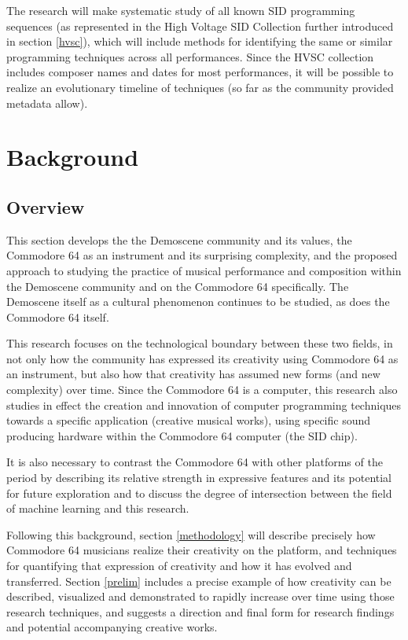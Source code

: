 \documentclass[10pt]{article}
\begin{document}
\begin{multicols*}{2}
The research will make systematic study of all known SID programming sequences (as represented in the High Voltage SID Collection\cite{hvsc} further introduced in section \ref{hvsc}), which will include methods for identifying the same or similar programming techniques across all performances. Since the HVSC collection includes composer names and dates for most performances, it will be possible to realize an evolutionary timeline of techniques (so far as the community provided metadata allow).

  \section{Background}

  \subsection{Overview}

This section develops the  the Demoscene community and its values, the Commodore 64 as an instrument and its surprising complexity, and the proposed approach to studying the practice of musical performance and composition within the Demoscene community and on the Commodore 64 specifically. The Demoscene itself as a cultural phenomenon continues to be studied, as does the Commodore 64 itself.

This research focuses on the technological boundary between these two fields, in not only how the community has expressed its creativity using Commodore 64 as an instrument, but also how that creativity has assumed new forms (and new complexity) over time. Since the Commodore 64 is a computer, this research also studies in effect the creation and innovation of computer programming techniques towards a specific application (creative musical works), using specific sound producing hardware within the Commodore 64 computer (the SID chip).

It is also necessary to contrast the Commodore 64 with other platforms of the period by describing its relative strength in expressive features and its potential for future exploration and to discuss the degree of intersection between the field of machine learning and this research.

Following this background, section \ref{methodology} will describe precisely how Commodore 64 musicians realize their creativity on the platform, and techniques for quantifying that expression of creativity and how it has evolved and transferred. Section \ref{prelim} includes a precise example of how creativity can be described, visualized and demonstrated to rapidly increase over time using those research techniques, and suggests a direction and final form for research findings and potential accompanying creative works.


\end{multicols*}
\end{document}
